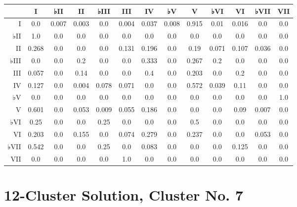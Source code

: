 \begin{table}[htbp]
\begin{minipage}{\linewidth}
\setlength{\tymax}{0.5\linewidth}
\centering
\small
\begin{tabulary}{\textwidth}{@{}RCCCCCCCCCCCC@{}} \toprule
&I&♭II&II&♭III&III&IV&♭V&V&♭VI&VI&♭VII&VII\\
\midrule
I&0.0&0.007&0.003&0.0&0.004&0.037&0.008&0.915&0.01&0.016&0.0&0.0\\
♭II&1.0&0.0&0.0&0.0&0.0&0.0&0.0&0.0&0.0&0.0&0.0&0.0\\
II&0.268&0.0&0.0&0.0&0.131&0.196&0.0&0.19&0.071&0.107&0.036&0.0\\
♭III&0.0&0.0&0.2&0.0&0.0&0.333&0.0&0.267&0.2&0.0&0.0&0.0\\
III&0.057&0.0&0.14&0.0&0.0&0.4&0.0&0.203&0.0&0.2&0.0&0.0\\
IV&0.127&0.0&0.004&0.078&0.071&0.0&0.0&0.572&0.039&0.11&0.0&0.0\\
♭V&0.0&0.0&0.0&0.0&0.0&0.0&0.0&0.0&0.0&0.0&0.0&1.0\\
V&0.601&0.0&0.053&0.009&0.055&0.186&0.0&0.0&0.0&0.09&0.007&0.0\\
♭VI&0.25&0.0&0.0&0.25&0.0&0.0&0.0&0.5&0.0&0.0&0.0&0.0\\
VI&0.203&0.0&0.155&0.0&0.074&0.279&0.0&0.237&0.0&0.0&0.053&0.0\\
♭VII&0.542&0.0&0.0&0.25&0.0&0.083&0.0&0.0&0.0&0.125&0.0&0.0\\
VII&0.0&0.0&0.0&0.0&1.0&0.0&0.0&0.0&0.0&0.0&0.0&0.0\\

\bottomrule

\end{tabulary}
\end{minipage}
\end{table}

\section{12-Cluster Solution, Cluster No. 7}
\label{12-clustersolutionclusterno.7}

